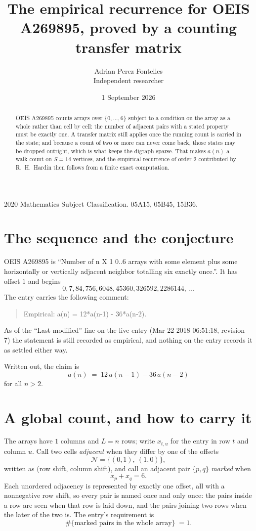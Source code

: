 \documentclass[11pt,a4paper]{article}
\title{The empirical recurrence for OEIS A269895, proved by a counting transfer matrix}
\author{Adrian Perez Fontelles\\ \small Independent researcher}
\date{1 September 2026}
\theoremstyle{plain}
\theoremstyle{definition}
\begin{document}
\maketitle

\begin{abstract}
OEIS A269895 counts arrays over $\{0,\dots,6\}$ subject to a condition on the array as a
whole rather than cell by cell: the number of adjacent pairs with a stated property must be
exactly one. A transfer matrix still applies once the running count is carried in the state; and
because a count of two or more can never come back, those states may be dropped outright,
which is what keeps the digraph sparse. That makes $a(n)$ a walk count on $S=14$ vertices,
and the empirical recurrence of order $2$ contributed by R.~H.~Hardin then follows from
a finite exact computation.
\end{abstract}

\noindent\small 2020 Mathematics Subject Classification. 05A15, 05B45, 15B36.\normalsize

\section{The sequence and the conjecture}

OEIS A269895 is ``Number of n X 1 0..6 arrays with some element plus some horizontally or vertically adjacent neighbor totalling six exactly once.''. It has offset $1$ and begins
\[
0, 7, 84, 756, 6048, 45360, 326592, 2286144,\ \dots
\]
The entry carries the following comment:
\begin{quote}\small
Empirical: a(n) = 12*a(n-1) - 36*a(n-2).
\end{quote}
As of the ``Last modified'' line on the live entry (Mar 22 2018 06:51:18, revision 7) the statement is
still recorded as empirical, and nothing on the entry records it as settled either way.

Written out, the claim is
\begin{equation}\label{eq:conj}
a(n)\;=\;12\,a(n-1) - 36\,a(n-2)
\end{equation}
for all $n>2$.

\section{A global count, and how to carry it}

The arrays have $1$ columns and $L=n$ rows; write $x_{t,u}$ for the entry in
row $t$ and column $u$. Call two cells \emph{adjacent} when they differ by one of the
offsets
\[
\mathcal N=\{(0,1),\ (1,0)\},
\]
written as (row shift, column shift), and call an adjacent pair $\{p,q\}$
\emph{marked} when
\[
x_{p}+x_{q}=6 .
\]
Each unordered adjacency is represented by exactly one offset, all with a nonnegative row
shift, so every pair is named once and only once: the pairs inside a row are seen when
that row is laid down, and the pairs joining two rows when the later of the two is. The
entry's requirement is
\begin{equation}\label{eq:glob}
\#\{\text{marked pairs in the whole array}\}\;=1.
\end{equation}
\end{document}
